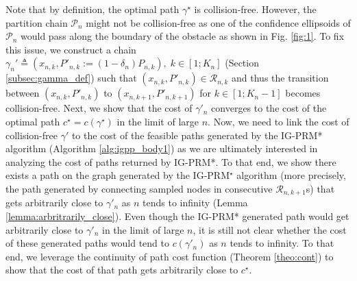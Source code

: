 \documentclass[Afour,sageh,times]{sagej}
\begin{document}
Note that by definition, the optimal path $\gamma^\star$ is collision-free. However, the partition chain $\mathcal{P}_n$ might not be collision-free as one of the confidence ellipsoids of $\mathcal{P}_n$ would pass along the boundary of the obstacle as shown in Fig. \ref{fig:1}. To fix this issue, we construct a  chain $\gamma_n'\triangleq(x_{n,k},P'_{n,k}:=(1-\delta_n)P_{n,k}),\;k\in[1;K_n]$ (Section \ref{subsec:gamma_def}) such that $(x_{n,k},P'_{n,k}) \in \mathcal{R}_{n,k}$ and thus the transition between $(x_{n,k},P'_{n,k})$ to $(x_{n,k+1},P'_{n,k+1})$ for $k\in[1;K_n-1]$ becomes collision-free. Next, we show that the cost of $\gamma'_n$ converges to the cost of the optimal path $c^\star=c(\gamma^\star)$ in the limit of large $n$. Now, we need to link the cost of collision-free $\gamma'$ to the cost of the feasible paths generated by the IG-PRM* algorithm (Algorithm \ref{alg:igpp_body1}) as we are ultimately interested in analyzing the cost of paths returned by IG-PRM*. To that end, we show there exists a path on the graph generated by the IG-PRM$^\star$ algorithm (more precisely, the path generated by connecting sampled nodes in consecutive $ \mathcal{R}_{n,k+1}$s) that gets arbitrarily close to $\gamma'_n$ as $n$ tends to infinity (Lemma \ref{lemma:arbritrarily_close}). Even though the IG-PRM* generated path would get arbitrarily close to $\gamma'_n$ in the limit of large $n$, it is still not clear whether the cost of these generated paths would tend to $c(\gamma'_n)$ as $n$ tends to infinity. To that end, we leverage the continuity of path cost function (Theorem \ref{theo:cont}) to show that the cost of that path gets arbitrarily close to $c^\star$.%



\end{document}
